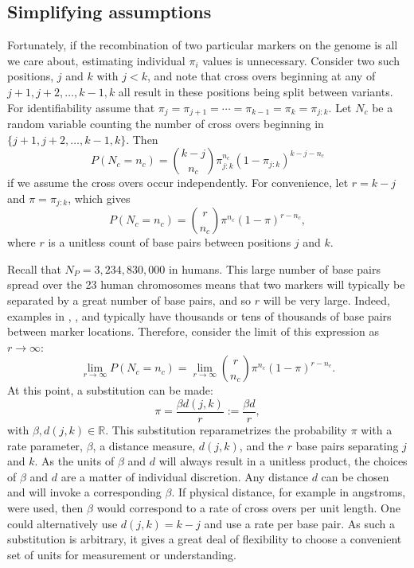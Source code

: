 \documentclass{article}
\newcommand{\field}[1]{\mathbb{#1}}
\newcommand{\Reals}{\field{R}}
\begin{document}
\subsection{Simplifying assumptions} \label{subsec:simplify}

Fortunately, if the recombination of two particular markers on the genome is all we care about, estimating individual $\pi_i$ values is unnecessary. Consider two such positions, $j$ and $k$ with $j < k$, and note that cross overs beginning at any of $j+1, j+2, \dots, k-1, k$ all result in these positions being split between variants. For identifiability assume that $\pi_j = \pi_{j+1} = \cdots = \pi_{k-1} = \pi_k = \pi_{j:k}$. Let $N_c$ be a random variable counting the number of cross overs beginning in $\{j+1,j+2,\dots,k-1,k\}$. Then
$$P(N_c = n_c) = {k - j \choose n_c} \pi_{j:k}^{n_c} (1-\pi_{j:k})^{k - j - n_c}$$
if we assume the cross overs occur independently. For convenience, let $r = k - j$ and $\pi = \pi_{j:k}$, which gives
\begin{equation} \label{eq:binomialDist}
  P(N_c = n_c) = {r \choose n_c} \pi^{n_c} (1-\pi)^{r - n_c},
\end{equation}
where $r$ is a unitless count of base pairs between positions $j$ and $k$.

Recall that $N_P = 3,234,830,000$ in humans. This large number of base pairs spread over the 23 human chromosomes means that two markers will typically be separated by a great number of base pairs, and so $r$ will be very large. Indeed, examples in \cite{nyholt2004}, \cite{Salyakina2005}, and \cite{Galwey2009} typically have thousands or tens of thousands of base pairs between marker locations. Therefore, consider the limit of this expression as $r \rightarrow \infty$:
$$\lim_{r \rightarrow \infty} P(N_c = n_c) = \lim_{r \rightarrow \infty} {r \choose n_c} \pi^{n_c} (1-\pi)^{r - n_c}.$$
At this point, a substitution can be made:
$$\pi = \frac{\beta d(j,k)}{r} := \frac{\beta d}{r},$$
with $\beta, d(j,k) \in \Reals$. This substitution reparametrizes the probability $\pi$ with a rate parameter, $\beta$, a distance measure, $d(j,k)$, and the $r$ base pairs separating $j$ and $k$. As the units of $\beta$ and $d$ will always result in a unitless product, the choices of $\beta$ and $d$ are a matter of individual discretion. Any distance $d$ can be chosen and will invoke a corresponding $\beta$. If physical distance, for example in angstroms, were used, then $\beta$ would correspond to a rate of cross overs per unit length. One could alternatively use $d(j,k)=k-j$ and use a rate per base pair. As such a substitution is arbitrary, it gives a great deal of flexibility to choose a convenient set of units for measurement or understanding.
\end{document}
